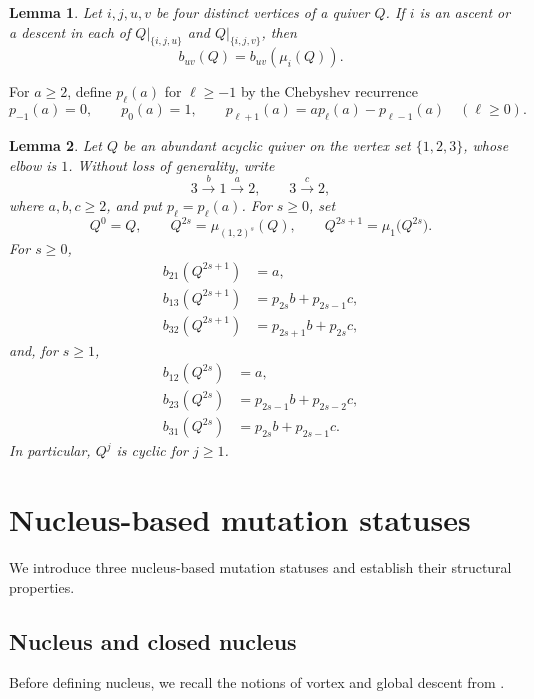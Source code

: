 \documentclass[10pt,a4paper]{amsart}
\newtheorem{lemma}[lemma]{Lemma}
\theoremstyle{definition}
\theoremstyle{definition}
\numberwithin{equation}{section}
\numberwithin{table}{section}
\begin{document}
\begin{lemma}\label{lem:rank-three-edge-invariance}
Let $i,j,u,v$ be four distinct vertices of a quiver $Q$. If $i$ is an
ascent or a descent in each of $Q|_{\{i,j,u\}}$ and
$Q|_{\{i,j,v\}}$, then
\[
 b_{uv}(Q)=b_{uv}(\mu_i(Q)).
\]
\end{lemma}

For $a\ge2$, define $p_\ell(a)$ for $\ell\ge-1$ by the Chebyshev recurrence
\begin{equation}\label{eq:rank-three-recurrence}
 p_{-1}(a)=0,\qquad p_0(a)=1,\qquad
 p_{\ell+1}(a)=a p_\ell(a)-p_{\ell-1}(a)\quad(\ell\ge0).
\end{equation}
\begin{lemma}\label{lem:rank-three-alternating}
Let $Q$ be an abundant acyclic quiver on the vertex set
$\{1,2,3\}$, whose elbow is $1$. Without loss of generality, write
\[
 3\xrightarrow{\,b\,}1\xrightarrow{\,a\,}2,
 \qquad 3\xrightarrow{\,c\,}2,
\]
where $a,b,c\ge2$, and put $p_\ell=p_\ell(a)$. For $s\ge0$, set
\[
 Q^0=Q,\qquad Q^{2s}=\mu_{(1,2)^s}(Q),\qquad
 Q^{2s+1}=\mu_1\bigl(Q^{2s}\bigr).
\]
For $s\ge0$,
\[
 \begin{aligned}
 b_{21}(Q^{2s+1})&=a,\\
 b_{13}(Q^{2s+1})&=p_{2s}b+p_{2s-1}c,\\
 b_{32}(Q^{2s+1})&=p_{2s+1}b+p_{2s}c,
 \end{aligned}
\]
and, for $s\ge1$,
\[
 \begin{aligned}
 b_{12}(Q^{2s})&=a,\\
 b_{23}(Q^{2s})&=p_{2s-1}b+p_{2s-2}c,\\
 b_{31}(Q^{2s})&=p_{2s}b+p_{2s-1}c.
 \end{aligned}
\]
In particular, $Q^{j}$ is cyclic for $j\ge1$.
\end{lemma}

\section{Nucleus-based mutation statuses}\label{sec:classes}

We introduce three nucleus-based mutation statuses and establish their
structural properties.

\subsection{Nucleus and closed nucleus}\label{subsec:the-nucleus}

Before defining nucleus, we recall the notions of vortex and global descent
from \cite[Definitions~6.2 and 6.3]{FN25}.
\end{document}
